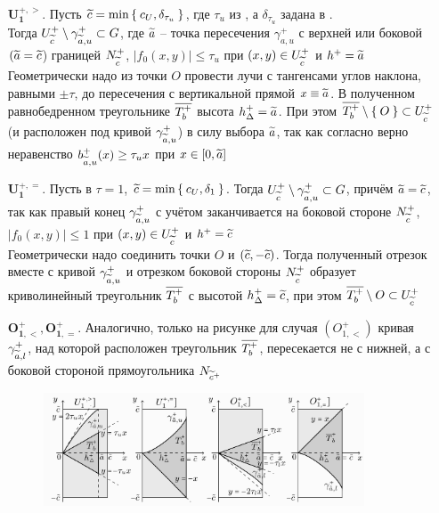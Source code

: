 \begin{enumerate}
    \item[$ \bm{U_1^{+, >}} $.] Пусть $ \widetilde{c} = \min\Set{c_U, \delta_{\tau_u}} $, где $ \tau_u $ из , а $ \delta_{\tau_u} $ задана в . \\
    Тогда $ U_{\widetilde{c}}^+ \setminus \gamma_{\widetilde{a}, u}^+ \subset G $, где $ \widetilde{a} $ -- точка пересечения $ \gamma_{a, u}^+ $ с верхней или боковой $ (\widetilde{a} = \widetilde{c} $) границей $ N_{\widetilde{c}}^+ $, $ |f_0(x, y)| \le \tau_u $ при $ (x, y) \in U_{\widetilde{c}}^+ $ и $ h^+ = \widetilde{a} $ \\
    Геометрически надо из точки $ O $ провести лучи с тангенсами углов наклона, равными $ \pm \tau $, до пересечения с вертикальной прямой $ x \equiv \widetilde{a} $. В полученном равнобедренном треугольнике $ \overline{T_b^+} $ высота $ h_\Delta^+ = \widetilde{a} $. При этом $ \overline{T_b^+} \setminus \Set{O} \subset U_{\widetilde{c}}^+ $ (и расположен под кривой $ \gamma_{\widetilde{a}, u}^+ $) в силу выбора $ \widetilde{a} $, так как согласно  верно неравенство $ b_{\widetilde{a}, u}^+(x) \ge \tau_ux $ при $ x \in [0, \widetilde{a}] $
    \item[$ \bm{U_1^{+, =}} $.] Пусть в  $ \tau = 1 $, $ \widetilde{c} = \min\Set{c_U, \delta_1} $. Тогда $ U_{\widetilde{c}}^+ \setminus \gamma_{\widetilde{a}, u}^+ \subset G $, причём $ \widetilde{a} = \widetilde{c} $, так как правый конец $ \gamma_{\widetilde{a}, u}^+ $ с учётом  заканчивается на боковой стороне $ N_{\widetilde{c}}^+ $, $ |f_0(x, y)| \le 1 $ при $ (x, y) \in U_{\widetilde{c}}^+ $ и $ h^+ = \widetilde{c} $ \\
    Геометрически надо соединить точки $ O $ и $ (\widetilde{c}, -\widetilde{c}) $. Тогда полученный отрезок вместе с кривой $ \gamma_{\widetilde{a}, u}^+ $ и отрезком боковой стороны $ N_{\widetilde{c}}^+ $ образует криволинейный треугольник $ \overline{T_b^+} $ с высотой $ h_\Delta^+ = \widetilde{c} $, при этом $ \overline{T_b^+} \setminus O \subset U_{\widetilde{c}}^+ $
    \item[$ \bm{O_{1, <}^+}, \bm{O_{1, =}^+} $.] Аналогично, только на рисунке для случая $ (O_{1, <}^+) $ кривая $ \gamma_{\widetilde{a}, l}^+ $, над которой расположен треугольник $ \overline{T_b^+} $, пересекается не с нижней, а с боковой стороной прямоугольника $ N_{\widetilde{c}^+} $

    \begin{figure}[!h]
        \centering
    	\includegraphics[width=0.9\textwidth]{boundary_curves_4}
    \end{figure}


\end{enumerate}
